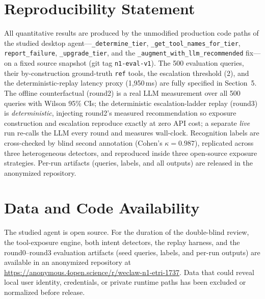 \documentclass[AMS,STIX2COL]{WileyNJDv5}
\begin{document}
\section*{Reproducibility Statement}
All quantitative results are produced by the unmodified production code paths of the studied desktop agent---\texttt{\_determine\_tier}, \texttt{\_get\_tool\_names\_for\_tier}, \texttt{report\_failure}, \texttt{\_upgrade\_tier}, and the \texttt{\_augment\_with\_llm\_recommended} fix---on a fixed source snapshot (git tag \texttt{n1-eval-v1}). The 500 evaluation queries, their by-construction ground-truth \texttt{ref} tools, the escalation threshold (2), and the deterministic-replay latency proxy (1,950\,ms) are fully specified in Section~5. The offline counterfactual (round2) is a real LLM measurement over all 500 queries with Wilson 95\% CIs; the deterministic escalation-ladder replay (round3) is \emph{deterministic}, injecting round2's measured recommendation so exposure construction and escalation reproduce exactly at zero API cost; a separate \emph{live} run re-calls the LLM every round and measures wall-clock. Recognition labels are cross-checked by blind second annotation (Cohen's $\kappa=0.987$), replicated across three heterogeneous detectors, and reproduced inside three open-source exposure strategies. Per-run artifacts (queries, labels, and all outputs) are released in the anonymized repository.

\section*{Data and Code Availability}
The studied agent is open source. For the duration of the double-blind review, the tool-exposure engine, both intent detectors, the replay harness, and the round0--round3 evaluation artifacts (seed queries, labels, and per-run outputs) are available in an anonymized repository at \url{https://anonymous.4open.science/r/weclaw-n1-etri-1737}. Data that could reveal local user identity, credentials, or private runtime paths has been excluded or normalized before release.


\end{document}

